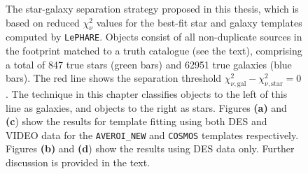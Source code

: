 \begin{figure}
\caption[Star-galaxy separation verification]{The star-galaxy separation strategy proposed in this thesis, which is based on reduced $\chi^2_{\nu}$ values for the best-fit star and galaxy templates computed by \texttt{LePHARE}. Objects consist of all non-duplicate sources in the \DESVIDEO footprint matched to a truth catalogue (see the text), comprising a total of 847 true stars (green bars) and \num{62 951} true galaxies (blue bars). The red line shows the separation threshold $\chi^2_{\nu,\mathrm{gal}}- \chi^2_{\nu,\mathrm{star}} = 0$. The technique in this chapter classifies objects to the left of this line as galaxies, and objects to the right as stars. Figures  \textbf{(a)} and \textbf{(c}) show the results for template fitting using both DES and VIDEO data for the \texttt{AVEROI\_NEW} and \texttt{COSMOS} templates respectively. Figures  \textbf{(b)} and \textbf{(d}) show the results using DES data only.  Further discussion is provided in the text.}
\label{fig:star_galaxy}
\end{figure}


